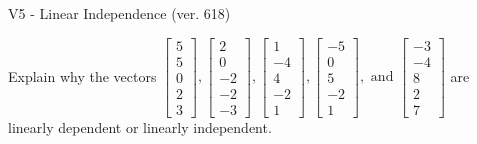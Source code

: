 \begin{exercise}
  \begin{exerciseTitle}V5 - Linear Independence (ver. 618)\end{exerciseTitle}
  \begin{exerciseStatement}
    Explain why the vectors \(\left[\begin{array}{r}
5 \\
5 \\
0 \\
2 \\
3
\end{array}\right] , \left[\begin{array}{r}
2 \\
0 \\
-2 \\
-2 \\
-3
\end{array}\right] , \left[\begin{array}{r}
1 \\
-4 \\
4 \\
-2 \\
1
\end{array}\right] , \left[\begin{array}{r}
-5 \\
0 \\
5 \\
-2 \\
1
\end{array}\right] , \text{ and } \left[\begin{array}{r}
-3 \\
-4 \\
8 \\
2 \\
7
\end{array}\right]\) are linearly dependent or linearly independent.	



\end{exerciseStatement}
\end{exercise}
